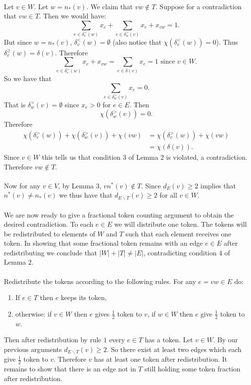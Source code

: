 \documentclass[letterpaper,12pt,oneside,onecolumn]{article}
\begin{document}
\paragraph{}
Let $v \in W$. Let $w = n_*(v)$. We claim that $vw \not\in T$. Suppose for a contradiction that $vw \in T$. Then we would have:
$$  \sum_{e \in \delta_v^>(w)} x_e + \sum_{e \in \delta_w^>(v)} x_e + x_{vw} = 1. $$
But since $w=n_*(v)$, $\delta_v^<(w) = \emptyset$ (also notice that $\chi(\delta_v^<(w)) = 0$). Thus $\delta_v^\geq(w) = \delta(v)$. Therefore
$$\sum_{e \in \delta_v^>(w)} x_e + x_{vw} = \sum_{e \in \delta(v)} x_e = 1 \text{ since $v \in W$}. $$
So we have that $$ \sum_{e \in \delta_w^>(v)} x_e = 0. $$ That is $\delta_w^>(v) = \emptyset$ since $x_e > 0$ for $e \in E$. Then $$\chi(\delta_w^>(v)) = 0.$$
Therefore
\begin{align*}
\chi(\delta_v^>(w)) + \chi(\delta_w^>(v)) + \chi(vw) &= \chi(\delta_v^>(w)) + \chi(vw) \\
&= \chi(\delta(v)).
\end{align*}
Since $v \in W$ this tells us that condition $3$ of Lemma $2$ is violated, a contradiction. Therefore $vw \not\in T$.
\paragraph{}
Now for any $v \in V$, by Lemma $3$, $vn^*(v) \not\in T$. Since $d_E(v) \geq 2$ implies that $n^*(v) \neq n_*(v)$ we thus have that $d_{E\backslash T}(v) \geq 2$ for all $v \in W$.
\paragraph{}
We are now ready to give a fractional token counting argument to obtain the desired contradiction. To each $e \in E$ we will distribute one token. The tokens will be redistributed to elements of $W$ and $T$ such that each element receives one token. In showing that some fractional token remains with an edge $e \in E$ after redistributing we conclude that $|W| + |T| \neq |E|$, contradicting condition $4$ of Lemma $2$.
\paragraph{}
Redistribute the tokens according to the following rules. For any $e=vw \in E$ do:
\begin{enumerate}
\item If $e \in T$ then $e$ keeps its token,
\item otherwise:
\subitem if $v \in W$ then $e$ gives $\frac{1}{2}$ token to $v$,
\subitem if $w \in W$ then $e$ give $\frac{1}{2}$ token to $w$.
\end{enumerate}
Then after redistribution by rule $1$ every $e \in T$ has a token. Let $v \in W$. By our previous arguments $d_{E\backslash T}(v) \geq 2$. So there exist at least two edges which each give $\frac{1}{2}$ token to $v$. Therefore $v$ has at least one token after redistribution. It remains to show that there is an edge not in $T$ still holding some token fraction after redistribution.
\end{document}
